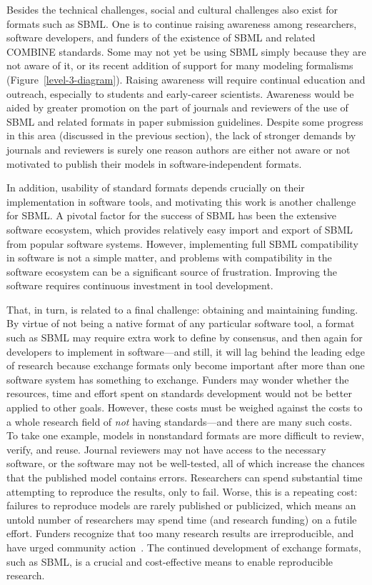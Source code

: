 \documentclass{sbml-paper}
\begin{document}
Besides the technical challenges, social and cultural challenges also exist for formats such as SBML.  One is to continue raising awareness among researchers, software developers, and funders of the existence of SBML and related COMBINE standards.  Some may not yet be using SBML simply because they are not aware of it, or its recent addition of support for many modeling formalisms (Figure~\ref{level-3-diagram}).  Raising awareness will require continual education and outreach, especially to students and early-career scientists.  Awareness would be aided by greater promotion on the part of journals and reviewers of the use of SBML and related formats in paper submission guidelines.  Despite some progress in this area (discussed in the previous section), the lack of stronger demands by journals and reviewers is surely one reason authors are either not aware or not motivated to publish their models in software-independent formats.

In addition, usability of standard formats depends crucially on their implementation in software tools, and motivating this work is another challenge for SBML.  A pivotal factor for the success of SBML has been the extensive software ecosystem, which provides relatively easy import and export of SBML from popular software systems.  However, implementing full SBML compatibility in software is not a simple matter, and problems with compatibility in the software ecosystem can be a significant source of frustration.  Improving the software requires continuous investment in tool development.

That, in turn, is related to a final challenge: obtaining and maintaining funding.  By virtue of not being a native format of any particular software tool, a format such as SBML may require extra work to define by consensus, and then again for developers to implement in software---and still, it will lag behind the leading edge of research because exchange formats only become important after more than one software system has something to exchange.  Funders may wonder whether the resources, time and effort spent on standards development would not be better applied to other goals.  However, these costs must be weighed against the costs to a whole research field of \emph{not} having standards---and there are many such costs.  To take one example, models in nonstandard formats are more difficult to review, verify, and reuse.  Journal reviewers may not have access to the necessary software, or the software may not be well-tested, all of which increase the chances that the published model contains errors.  Researchers can spend substantial time attempting to reproduce the results, only to fail.  Worse, this is a repeating cost: failures to reproduce models are rarely published or publicized, which means an untold number of researchers may spend time (and research funding) on a futile effort.  Funders recognize that too many research results are irreproducible, and have urged community action~\citep[e.g.,][]{Collins2014policy}.  The continued development of exchange formats, such as SBML, is a crucial and cost-effective means to enable reproducible research.
\end{document}
